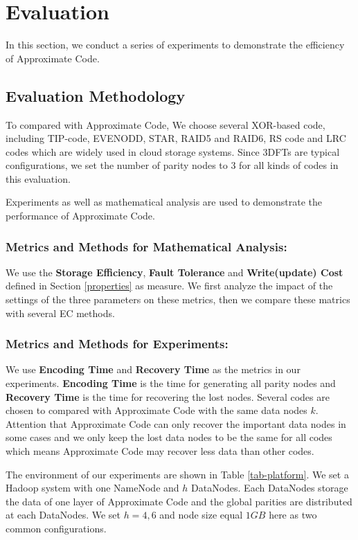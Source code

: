 \documentclass[sigconf]{acmart}
\begin{document}
\section{Evaluation}\label{evaluation}
In this section, we conduct a series of experiments to demonstrate the efficiency of Approximate Code. 
\subsection{Evaluation Methodology }
To compared with Approximate Code, We choose several XOR-based code, including TIP-code, EVENODD, STAR, RAID5 and RAID6, RS code and LRC codes which are widely used in cloud storage systems. Since 3DFTs are typical configurations, we set the number of parity nodes to 3 for all kinds of codes in this evaluation.

Experiments as well as mathematical analysis are used to demonstrate the performance of Approximate Code.

\subsubsection{Metrics and Methods for Mathematical Analysis: }
We use the \textbf{Storage Efficiency}, \textbf{Fault Tolerance} and \textbf{Write(update) Cost} defined in Section \ref{properties} as measure.
We first analyze the impact of the settings of the three parameters on these metrics, then we compare these matrics with several EC methods.

\subsubsection{Metrics and Methods for Experiments: }
We use \textbf{Encoding Time} and \textbf{Recovery Time} as the metrics in our experiments. \textbf{Encoding Time} is the time for generating all parity nodes and \textbf{Recovery Time} is the time for recovering the lost nodes.  Several codes are chosen to compared with Approximate Code with the same data nodes $k$. Attention that Approximate Code can only recover the important data nodes in some cases and we only keep the lost data nodes to be the same for all codes which means Approximate Code may recover less data than other codes.

The environment of our experiments are shown in Table \ref{tab-platform}. We set a Hadoop system with one NameNode and $h$ DataNodes. Each DataNodes storage the data of one layer of Approximate Code and the global parities are distributed at each DataNodes. We set $h=4,6$ and node size equal $1GB$ here as two common configurations. 
\end{document}

